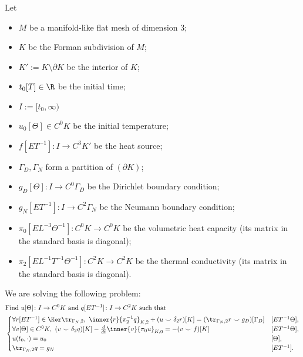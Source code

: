 \begin{formulation}
  Let
  \begin{itemize}
    \item
      $M$ be a manifold-like flat mesh of dimension $3$;
    \item
      $K$ be the Forman subdivision of $M$;
    \item
      $K' := K \setminus \partial K$ be the interior of $K$;
    \item
      $t_0 [T]\in \R$ be the initial time;
    \item
      $I := [t_0, \infty)$
    \item
      $u_0 [\Theta] \in C^0 K$ be the initial temperature;
    \item
      $f [E T^{-1}] \colon I \to C^3 K'$ be the heat source;
    \item
      $\Gamma_D, \Gamma_N$ form a partition of $(\partial K)$;
    \item
      $g_D [\Theta] \colon I \to C^0 \Gamma_D$
      be the Dirichlet boundary condition;
    \item
      $g_N [E T^{-1}] \colon I \to C^2 \Gamma_N$
      be the Neumann boundary condition;
    \item
      $\pi_0 [E L^{-3} \Theta^{-1}] \colon C^0 K \to C^0 K$
      be the volumetric heat capacity
      (its matrix in the standard basis is diagonal);
    \item
      $\pi_2 [E L^{-1} T^{-1} \Theta^{-1}] \colon C^2 K \to C^2 K$
      be the thermal conductivity
      (its matrix in the standard basis is diagonal).
  \end{itemize}
  We are solving the following problem:
  \begin{equation}
    \begin{split}
      & \text{Find $u [\Theta] \colon I \to C^0 K$ and
        $q [E T^{-1}] \colon I \to C^2 K$ such that} \\
      &
      \begin{cases}
        \forall r [E T^{-1}]\in \Ker \tr_{\Gamma_N, 2},\
          \inner{r}{\pi_2^{-1} q}_{K, 2} + (u \smile \delta_2 r)[K]
          = (\tr_{\Gamma_N, 2} r \smile g_D)[\Gamma_D] & [E T^{-1} \Theta], \\
        \forall v [\Theta]\in C^0 K,\
          (v \smile \delta_2 q)[K] - \frac{d}{d t} \inner{v}{\pi_0 u}_{K, 0}
          = - (v \smile f)[K] & [E T^{-1} \Theta], \\
        u(t_0, \cdot) = u_0 & [\Theta], \\
        \tr_{\Gamma_N, 2} q = g_N & [E T^{-1}].

\end{cases}
\end{split}
\end{equation}
\end{formulation}
